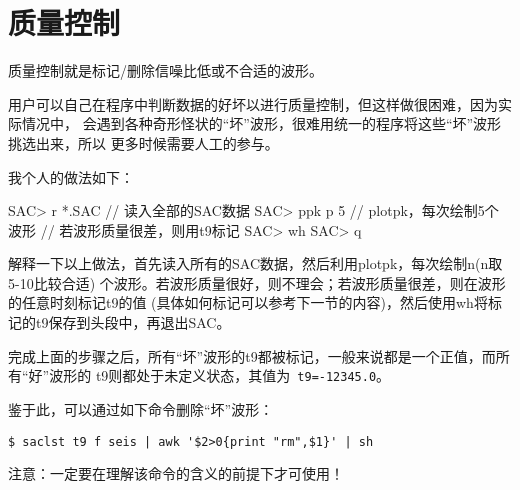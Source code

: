 \section{质量控制}

质量控制就是标记/删除信噪比低或不合适的波形。

用户可以自己在程序中判断数据的好坏以进行质量控制，但这样做很困难，因为实际情况中，
会遇到各种奇形怪状的``坏''波形，很难用统一的程序将这些``坏''波形挑选出来，所以
更多时候需要人工的参与。


我个人的做法如下：
\begin{SACCode}
SAC> r *.SAC        // 读入全部的SAC数据
SAC> ppk p 5        // plotpk，每次绘制5个波形
// 若波形质量很差，则用t9标记
SAC> wh
SAC> q
\end{SACCode}

解释一下以上做法，首先读入所有的SAC数据，然后利用plotpk，每次绘制n(n取5-10比较合适)
个波形。若波形质量很好，则不理会；若波形质量很差，则在波形的任意时刻标记t9的值
(具体如何标记可以参考下一节的内容)，然后使用wh将标记的t9保存到头段中，再退出SAC。

完成上面的步骤之后，所有``坏''波形的t9都被标记，一般来说都是一个正值，而所有``好''波形的
t9则都处于未定义状态，其值为~\verb+t9=-12345.0+。

鉴于此，可以通过如下命令删除``坏''波形：
\begin{verbatim}
$ saclst t9 f seis | awk '$2>0{print "rm",$1}' | sh
\end{verbatim}

注意：一定要在理解该命令的含义的前提下才可使用！
